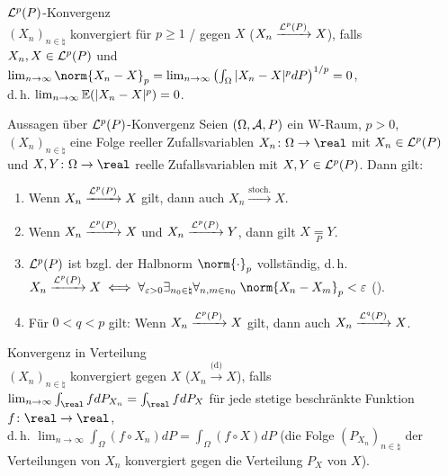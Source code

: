 \linie
\pagebreak

\begin{Def}{$\mathcal{L}^p(P)$-Konvergenz}\\
    $(X_n)_{n \in \natural}$ konvergiert für $p \ge 1$
    / gegen $X$
    ($X_n \xrightarrow{\mathcal{L}^p(P)} X$), falls\\
    $X_n, X \in \mathcal{L}^p(P)$ und
    $\lim_{n \to \infty} \norm{X_n - X}_p =
    \lim_{n \to \infty} \left(\int_\Omega |X_n - X|^p dP\right)^{1/p} = 0$,\\
    d.\,h. $\lim_{n \to \infty} \mathbb{E}(|X_n - X|^p) = 0$.
\end{Def}

\begin{Satz}{Aussagen über $\mathcal{L}^p(P)$-Konvergenz}
    Seien $(\Omega, \mathcal{A}, P)$ ein W-Raum, $p > 0$,
    $(X_n)_{n \in \natural}$ eine Folge reeller Zufallsvariablen
    $X_n\colon \Omega \rightarrow \real$ mit $X_n \in \mathcal{L}^p(P)$ und
    $X, Y\colon \Omega \rightarrow \real$ reelle Zufallsvariablen mit $X, Y \in \mathcal{L}^p(P)$.
    Dann gilt:
    \begin{enumerate}
        \item
        Wenn $X_n \xrightarrow{\mathcal{L}^p(P)} X$ gilt, dann auch
        $X_n \xrightarrow{\text{stoch.}} X$.
        
        \item
        Wenn $X_n \xrightarrow{\mathcal{L}^p(P)} X$ und $X_n \xrightarrow{\mathcal{L}^p(P)} Y$,
        dann gilt $X \underset{P}{=} Y$.
        
        \item
        $\mathcal{L}^p(P)$ ist bzgl. der Halbnorm $\norm{\cdot}_p$ vollständig, d.\,h.\\
        $X_n \xrightarrow{\L^p(P)} X
        \iff \forall_{\varepsilon > 0} \exists_{n_0 \in \natural} \forall_{n, m \in n_0}\;
        \norm{X_n - X_m}_p < \varepsilon$
        ().
        
        \item
        Für $0 < q < p$ gilt:
        Wenn $X_n \xrightarrow{\mathcal{L}^p(P)} X$ gilt, dann auch
        $X_n \xrightarrow{\mathcal{L}^q(P)} X$.
    \end{enumerate}
\end{Satz}

\linie

\begin{Def}{Konvergenz in Verteilung}\\
    $(X_n)_{n \in \natural}$ konvergiert  gegen $X$
    ($X_n \xrightarrow{\text{(d)}} X$), falls\\
    $\lim_{n \to \infty} \int_\real f dP_{X_n} = \int_\real f dP_X$ für jede
    stetige beschränkte Funktion $f\colon \real \rightarrow \real$,\\
    d.\,h. $\lim_{n \to \infty} \int_\Omega (f \circ X_n) dP = \int_\Omega (f \circ X) dP$
    (die Folge $(P_{X_n})_{n \in \natural}$ der Verteilungen von $X_n$ konvergiert
     gegen die Verteilung $P_X$ von $X$).
\end{Def}

